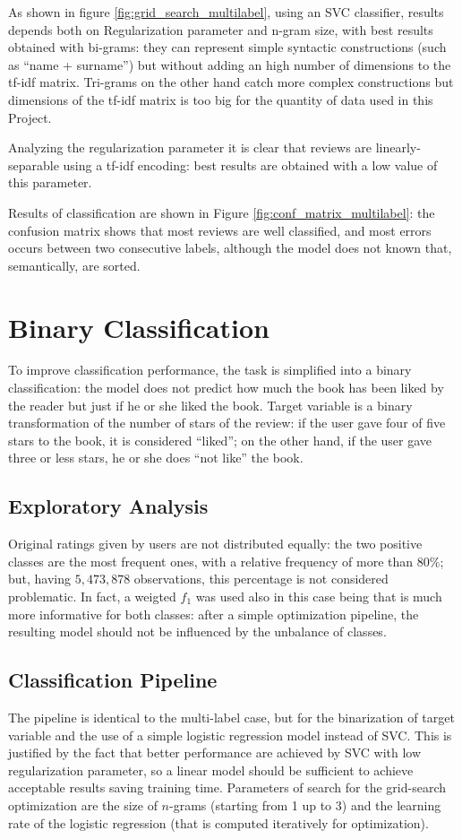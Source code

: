 \documentclass[fleqn,10pt]{SelfArx}
\begin{document}
As shown in figure \ref{fig:grid_search_multilabel}, using an SVC classifier, results depends both on Regularization parameter and n-gram size, with best results obtained with bi-grams: they can represent simple syntactic constructions (such as ``name + surname'') but without adding an high number of dimensions to the tf-idf matrix.
Tri-grams on the other hand catch more complex constructions but dimensions of the tf-idf matrix is too big for the quantity of data used in this Project.

Analyzing the regularization parameter it is clear that reviews are linearly-separable using a tf-idf encoding: best results are obtained with a low value of this parameter.

Results of classification are shown in Figure \ref{fig:conf_matrix_multilabel}: the confusion matrix shows that most reviews are well classified, and most errors occurs between two consecutive labels, although the model does not known that, semantically, are sorted.


\section{Binary Classification}
To improve classification performance, the task is simplified into a binary classification: the model does not predict how much the book has been liked by the reader but just if he or she liked the book.
Target variable is a binary transformation of the number of stars of the review: if the user gave four of five stars to the book, it is considered ``liked''; on the other hand, if the user gave three or less stars, he or she does ``not like'' the book.

\subsection{Exploratory Analysis}
Original ratings given by users are not distributed equally: the two positive classes are the most frequent ones, with a relative frequency of more than $80\%$; but, having $5,473,878$ observations, this percentage is not considered problematic.
In fact, a weigted $f_1$ was used also in this case being that is much more informative for both classes: after a simple optimization pipeline, the resulting model should not be influenced by the unbalance of classes.

\subsection{Classification Pipeline}
The pipeline is identical to the multi-label case, but for the binarization of target variable and the use of a simple logistic regression model instead of SVC.
This is justified by the fact that better performance are achieved by SVC with low regularization parameter, so a linear model should be sufficient to achieve acceptable results saving training time.
Parameters of search for the grid-search optimization are the size of $n$-grams (starting from 1 up to 3) and the learning rate of the logistic regression (that is computed iteratively for optimization).
\end{document}
